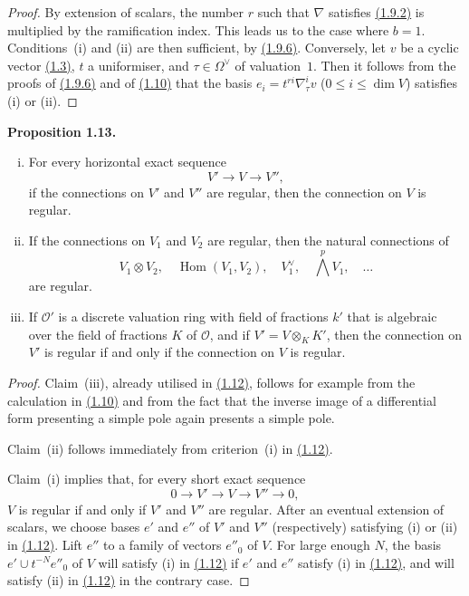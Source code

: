 \documentclass{report}
\newenvironment{itenv}[1]
  {\phantomsection\par\medskip\noindent\textbf{#1.}\itshape}
  {\medskip}
\renewcommand{\cal}[1]{{\mathcal{#1}}}
\renewcommand{\leq}{\leqslant}
\DeclareMathOperator{\Hom}{Hom}
\newcommand{\oldpage}[1]{\marginpar{\footnotesize$\Big\vert$ \textit{p.~#1}}}
\begin{document}
\begin{proof}
  By extension of scalars, the number $r$ such that $\nabla$ satisfies \hyperref[II.1.9.2]{(1.9.2)} is multiplied by the ramification index.
  This leads us to the case where $b=1$.
  Conditions~(i) and (ii) are then sufficient, by \hyperref[II.1.9.6]{(1.9.6)}.
  Conversely, let $v$ be a cyclic vector \hyperref[II.1.3]{(1.3)}, $t$ a uniformiser, and $\tau\in\Omega^\vee$ of valuation~$1$.
  Then it follows from the proofs of \hyperref[II.1.9.6]{(1.9.6)} and of \hyperref[II.1.10]{(1.10)} that the basis $e_i=t^{ri}\nabla_\tau^i v$ ($0\leq i\leq\dim V$) satisfies (i) or (ii).
\end{proof}

\begin{itenv}{Proposition 1.13}
\label{II.1.13}
  \begin{enumerate}[(i)]
    \item For every horizontal exact sequence
      \[
        V' \to V \to V'',
      \]
      if the connections on $V'$ and $V''$ are regular, then the connection on $V$ is regular.
    \item If the connections on $V_1$ and $V_2$ are regular, then the natural connections of
      \[
        V_1\otimes V_2,
        \quad \Hom(V_1,V_2),
        \quad V_1^\vee,
        \quad \bigwedge^p V_1,
        \quad \ldots
      \]
      are regular.
    \item If $\cal{O}'$ is a discrete valuation ring with field of fractions $k'$ that is algebraic over the field of fractions $K$ of $\cal{O}$, and if $V'=V\otimes_K K'$, then the connection on $V'$ is regular if and only if the connection on $V$ is regular.
  \end{enumerate}
\end{itenv}

\begin{proof}
  Claim~(iii), already utilised in \hyperref[II.1.12]{(1.12)}, follows for example from the calculation in \hyperref[II.1.10]{(1.10)} and from the fact that the inverse image of a differential form presenting a simple pole again presents a simple pole.

\oldpage{52}
  Claim~(ii) follows immediately from criterion~(i) in \hyperref[II.1.12]{(1.12)}.

  Claim~(i) implies that, for every short exact sequence
  \[
    0 \to V' \to V \to V'' \to 0,
  \]
  $V$ is regular if and only if $V'$ and $V''$ are regular.
  After an eventual extension of scalars, we choose bases $e'$ and $e''$ of $V'$ and $V''$ (respectively) satisfying (i) or (ii) in \hyperref[II.1.12]{(1.12)}.
  Lift $e''$ to a family of vectors $e''_0$ of $V$.
  For large enough $N$, the basis $e'\cup t^{-N}e''_0$ of $V$ will satisfy (i) in \hyperref[II.1.12]{(1.12)} if $e'$ and $e''$ satisfy (i) in \hyperref[II.1.12]{(1.12)}, and will satisfy (ii) in \hyperref[II.1.12]{(1.12)} in the contrary case.
\end{proof}
\end{document}
